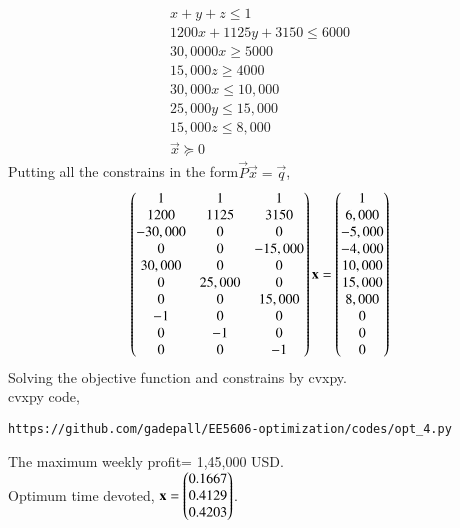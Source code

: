 \documentclass[journal,12pt,twocolumn]{IEEEtran}
\begin{document}
\begin{enumerate}
\begin{align}
x+y+z \leq 1\\
1200x+1125y+3150 \leq 6000\\
30,0000x \geq 5000\\
15,000z \geq 4000\\
30,000x \leq 10,000\\
25,000y \leq 15,000\\
15,000z \leq 8,000\\
\vec{x}\succeq 0
\end{align}
Putting all the constrains in the form$\vec{P}\vec{x}=\vec{q}$,
\begin{align}
\begin{pmatrix}1&1&1\\1200&1125&3150\\-30,000&0&0\\0&0&-15,000\\30,000&0&0\\0&25,000&0\\0&0&15,000\\-1&0&0\\0&-1&0\\0&0&-1\end{pmatrix}\mathbf{x}=\begin{pmatrix}1\\6,000\\-5,000\\-4,000\\10,000\\15,000\\8,000\\0\\0\\0\end{pmatrix}
\end{align}
Solving the objective function and constrains by cvxpy.\\
cvxpy code,
\begin{lstlisting}
https://github.com/gadepall/EE5606-optimization/codes/opt_4.py
\end{lstlisting}
The maximum weekly profit= 1,45,000 USD.\\
Optimum time devoted, $\mathbf{x} = \begin{pmatrix}0.1667\\ 0.4129\\ 0.4203\end{pmatrix}$.
\end{enumerate}
\end{document}
